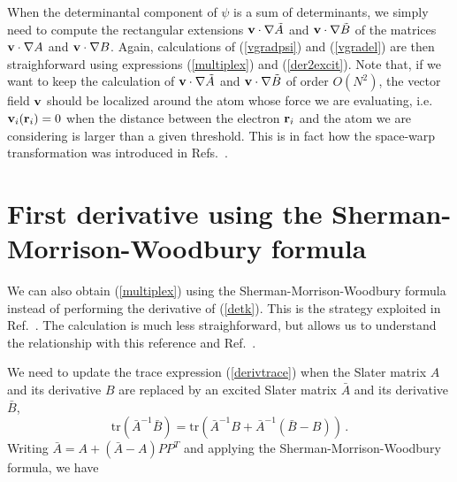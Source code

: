 \documentclass[aip,jcp,reprint,floatfix,onecolumn]{revtex4-1}
\def\tr{\text{tr}}
\begin{document}
When the determinantal component of $\psi$ is a sum of determinants, we simply need to compute the rectangular extensions
${\bf v}\cdot \nabla \tilde{A}$ and ${\bf v} \cdot \nabla \tilde{B}$ of the matrices  ${\bf v}\cdot \nabla {A}$ and ${\bf v} \cdot \nabla {B}$.
Again, calculations of (\ref{vgradpsi}) and (\ref{vgradel}) are then straighforward using expressions (\ref{multiplex}) and (\ref{der2excit}).
Note that, if we want to keep the calculation of ${\bf v}\cdot \nabla \tilde{A}$ and ${\bf v}\cdot \nabla \tilde{B}$ of order $O(N^2)$, the vector field
${\bf v}$ should be localized around the atom whose force we are evaluating, i.e. ${\bf v}_i({\bf r}_i) = 0$ when the distance between the electron ${\bf r}_i$ and the atom we are considering is larger than a given threshold. This is in fact how the space-warp transformation was introduced in Refs.~.

\section{First derivative using  the Sherman-Morrison-Woodbury formula}
\label{App_SM}

We can also  obtain (\ref{multiplex}) using the Sherman-Morrison-Woodbury formula instead of performing the
derivative of (\ref{detk}).  This is the strategy exploited in Ref.~. The calculation is much less straighforward, but allows us to understand the relationship with this reference  and Ref.~.

We need to update the trace expression (\ref{derivtrace}) when the Slater matrix $A$ and its derivative $B$ are replaced by an excited Slater matrix $\bar{A}$ and its derivative $\bar{B}$,
\begin{equation}
 \tr (\bar{A}^{-1}\bar{B})=  \tr \left(\bar{A}^{-1}B + \bar{A}^{-1}(\bar{B}-B) \right)\,.
\label{trab}
\end{equation}
Writing $\bar{A}=A + (\bar{A}-A)P P^T$ and applying the Sherman-Morrison-Woodbury formula, we have
\end{document}
